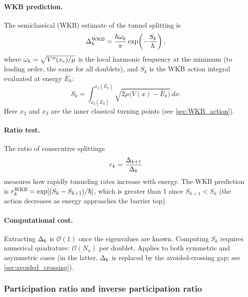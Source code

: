 \paragraph{WKB prediction.}

The semiclassical (WKB) estimate of the tunnel splitting is
\begin{equation}\label{eq:Delta_WKB}
  \Delta_k^{\text{WKB}} = \frac{\hbar\omega_k}{\pi}\exp\!\left(-\frac{S_k}{\hbar}\right),
\end{equation}
where $\omega_k = \sqrt{V''(x_e)/\mu}$ is the local harmonic frequency at the minimum (to leading order, the same for all doublets), and $S_k$ is the WKB action integral evaluated at energy $\bar{E}_k$:
\begin{equation}\label{eq:Sk}
  S_k = \int_{x_2(\bar{E}_k)}^{x_3(\bar{E}_k)} \sqrt{2\mu\bigl(V(x) - \bar{E}_k\bigr)}\,dx.
\end{equation}
Here $x_2$ and $x_3$ are the inner classical turning points (see \cref{sec:WKB_action}).

\paragraph{Ratio test.}

The ratio of consecutive splittings
\begin{equation}\label{eq:ratio_test}
  r_k = \frac{\Delta_{k+1}}{\Delta_k}
\end{equation}
measures how rapidly tunneling rates increase with energy.
The WKB prediction is $r_k^{\text{WKB}} = \exp[(S_k - S_{k+1})/\hbar]$, which is greater than 1 since $S_{k+1} < S_k$ (the action decreases as energy approaches the barrier top).

\paragraph{Computational cost.}
Extracting $\Delta_k$ is $\mathcal{O}(1)$ once the eigenvalues are known.
Computing $S_k$ requires numerical quadrature: $\mathcal{O}(N_x)$ per doublet.
Applies to both symmetric and asymmetric cases (in the latter, $\Delta_k$ is replaced by the avoided-crossing gap; see \cref{sec:avoided_crossing}).

\subsubsection{Participation ratio and inverse participation ratio}\label{sec:IPR}

